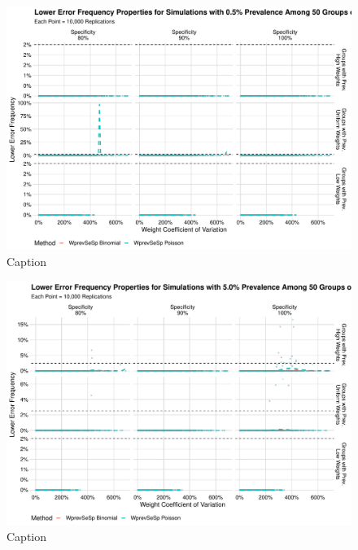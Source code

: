\documentclass[AMA,STIX1COL]{WileyNJD-v2}
\begin{document}
\begin{figure}
    \centering
    \includegraphics[width=\textwidth]{figures/imperfect_lower_error_frequency_50_0_005_reduced.pdf}
    \caption{Caption}
    \label{fig:imperfect_lower_error_frequency_50_0_005_reduced}
\end{figure}


\begin{figure}
    \centering
    \includegraphics[width=\textwidth]{figures/imperfect_lower_error_frequency_50_0_05_reduced.pdf}
    \caption{Caption}
    \label{fig:imperfect_lower_error_frequency_50_0_05_reduced}
\end{figure}
\end{document}
